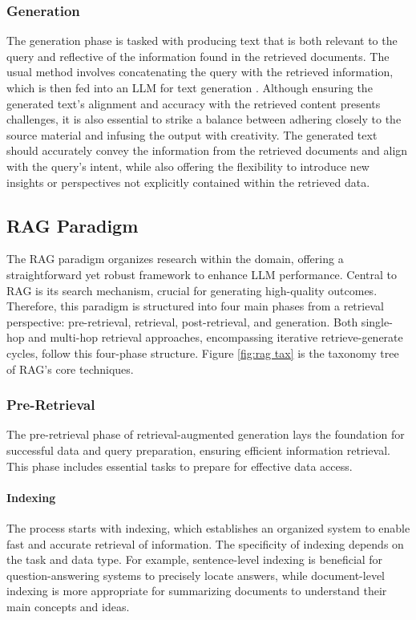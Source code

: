 \subsubsection{Generation}
The generation phase is tasked with producing text that is both relevant to the query and reflective of the information found in the retrieved documents. The usual method involves concatenating the query with the retrieved information, which is then fed into an LLM for text generation \cite{li2022survey}. Although ensuring the generated text's alignment and accuracy with the retrieved content presents challenges, it is also essential to strike a balance between adhering closely to the source material and infusing the output with creativity. The generated text should accurately convey the information from the retrieved documents and align with the query's intent, while also offering the flexibility to introduce new insights or perspectives not explicitly contained within the retrieved data.

\subsection{RAG Paradigm}
The RAG paradigm organizes research within the domain, offering a straightforward yet robust framework to enhance LLM performance. Central to RAG is its search mechanism, crucial for generating high-quality outcomes. Therefore, this paradigm is structured into four main phases from a retrieval perspective: pre-retrieval, retrieval, post-retrieval, and generation. Both single-hop and multi-hop retrieval approaches, encompassing iterative retrieve-generate cycles, follow this four-phase structure. Figure \ref{fig:rag tax} is the taxonomy tree of RAG's core techniques.

\subsubsection{Pre-Retrieval}
The pre-retrieval phase of retrieval-augmented generation lays the foundation for successful data and query preparation, ensuring efficient information retrieval. This phase includes essential tasks to prepare for effective data access.

\paragraph{Indexing} The process starts with indexing, which establishes an organized system to enable fast and accurate retrieval of information. The specificity of indexing depends on the task and data type. For example, sentence-level indexing is beneficial for question-answering systems to precisely locate answers, while document-level indexing is more appropriate for summarizing documents to understand their main concepts and ideas.

